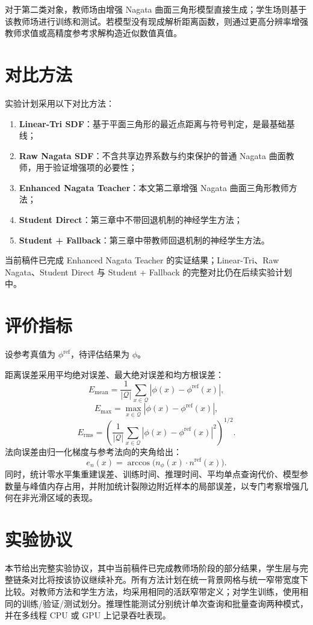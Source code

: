 \documentclass[12pt,oneside]{ctexbook}
\begin{document}
对于第二类对象，教师场由增强 Nagata 曲面三角形模型直接生成；学生场则基于该教师场进行训练和测试。若模型没有现成解析距离函数，则通过更高分辨率增强教师求值或高精度参考求解构造近似数值真值。

\section{对比方法}
实验计划采用以下对比方法：
\begin{enumerate}[label=\arabic*)]
  \item \textbf{Linear-Tri SDF}：基于平面三角形的最近点距离与符号判定，是最基础基线；
  \item \textbf{Raw Nagata SDF}：不含共享边界系数与约束保护的普通 Nagata 曲面教师，用于验证增强项的必要性；
  \item \textbf{Enhanced Nagata Teacher}：本文第二章增强 Nagata 曲面三角形教师方法；
  \item \textbf{Student Direct}：第三章中不带回退机制的神经学生方法；
  \item \textbf{Student + Fallback}：第三章中带教师回退机制的神经学生方法。
\end{enumerate}
当前稿件已完成 Enhanced Nagata Teacher 的实证结果；Linear-Tri、Raw Nagata、Student Direct 与 Student + Fallback 的完整对比仍在后续实验计划中。

\section{评价指标}
设参考真值为 $\phi^{\mathrm{ref}}$，待评估结果为 $\phi$。

距离误差采用平均绝对误差、最大绝对误差和均方根误差：
\[
E_{\mathrm{mean}}=\frac{1}{|\mathcal Q|}\sum_{x\in\mathcal Q}|\phi(x)-\phi^{\mathrm{ref}}(x)|,
\]
\[
E_{\max}=\max_{x\in\mathcal Q}|\phi(x)-\phi^{\mathrm{ref}}(x)|,
\]
\[
E_{\mathrm{rms}}=\left(\frac{1}{|\mathcal Q|}\sum_{x\in\mathcal Q}|\phi(x)-\phi^{\mathrm{ref}}(x)|^2\right)^{1/2}.
\]
法向误差由归一化梯度与参考法向的夹角给出：
\[
e_n(x)=\arccos\big(n_\phi(x)\cdot n^{\mathrm{ref}}(x)\big).
\]
同时，统计零水平集重建误差、训练时间、推理时间、平均单点查询代价、模型参数量与峰值内存占用，并附加统计裂隙边附近样本的局部误差，以专门考察增强几何在非光滑区域的表现。

\section{实验协议}
本节给出完整实验协议，其中当前稿件已完成教师场阶段的部分结果，学生层与完整链条对比将按该协议继续补充。所有方法计划在统一背景网格与统一窄带宽度下比较。对教师方法和学生方法，均采用相同的活跃窄带定义；对学生训练，使用相同的训练/验证/测试划分。推理性能测试分别统计单次查询和批量查询两种模式，并在多线程 CPU 或 GPU 上记录吞吐表现。
\end{document}
